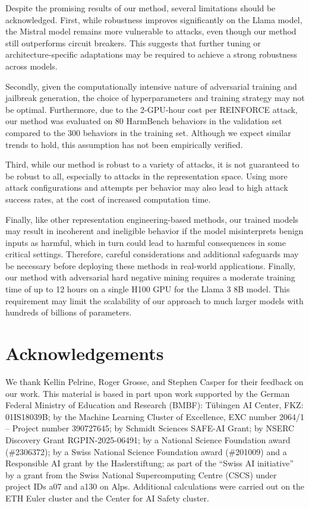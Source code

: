 \documentclass[11pt]{article}
\begin{document}
Despite the promising results of our method, several limitations should be acknowledged.
First, while robustness improves significantly on the Llama model,
the Mistral model remains more vulnerable to attacks, even though our method still outperforms circuit breakers.  This suggests that further tuning or architecture-specific adaptations may be required to achieve a strong robustness across models.

Secondly, given the computationally intensive nature of adversarial training and
jailbreak generation, the choice of hyperparameters and training strategy may
not be optimal. Furthermore, due to the 2-GPU-hour cost per REINFORCE attack,
our method was evaluated on 80 HarmBench behaviors in the validation set compared to 
the 300 behaviors in the training set. Although we expect similar trends to hold,
this assumption has not been empirically verified.

Third, while our method is robust to a variety of attacks, it is not guaranteed to be robust to all, especially to attacks in the representation space.
Using more attack configurations and attempts per behavior may also lead to high attack success rates, at the cost of increased computation time. 

Finally, like other representation engineering-based methods, our trained models
may result in incoherent and ineligible behavior if the model misinterprets benign
inputs as harmful, which in turn could lead to harmful consequences in some
critical settings. Therefore, careful considerations and additional safeguards
may be necessary before deploying these methods in real-world applications.
Finally, our method with adversarial hard negative mining requires a moderate training time of up to 12 hours on a
single H100 GPU for the Llama 3 8B model. This requirement may limit the scalability of
our approach to much larger models with hundreds of billions of parameters.



\section*{Acknowledgements}

We thank Kellin Pelrine, Roger Grosse, and Stephen Casper for their feedback on our work.
This material is based in part upon work supported by the German Federal Ministry of Education and Research (BMBF): Tübingen AI Center, FKZ: 01IS18039B; by the Machine Learning Cluster of Excellence, EXC number 2064/1 – Project number 390727645; by Schmidt Sciences SAFE-AI Grant; by NSERC Discovery Grant RGPIN-2025-06491; 
by a National Science Foundation award (\#2306372); by a Swiss National Science Foundation award (\#201009) and a Responsible AI grant by the Haslerstiftung;
as part of the ``Swiss AI initiative'' by a grant from the Swiss National Supercomputing Centre (CSCS) under project IDs a07 and a130 on Alps. Additional calculations were carried out on the ETH Euler cluster and the Center for AI Safety cluster.
\end{document}
